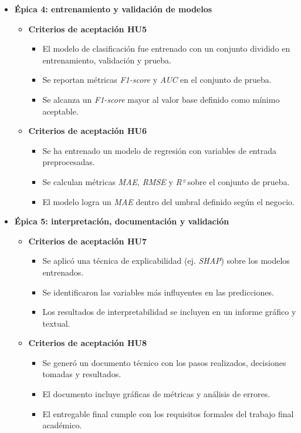 \documentclass[
11pt, %
]{charter}
\begin{document}
\begin{itemize}
  \item \textbf{Épica 4: entrenamiento y validación de modelos}
    \begin{itemize}
      \item \textbf{Criterios de aceptación HU5}
      \begin{itemize}
        \item El modelo de clasificación fue entrenado con un conjunto dividido en entrenamiento, validación y prueba.
        \item Se reportan métricas \textit{F1-score} y \textit{AUC} en el conjunto de prueba.
        \item Se alcanza un \textit{F1-score} mayor al valor base definido como mínimo aceptable.
      \end{itemize}
      \item \textbf{Criterios de aceptación HU6}
      \begin{itemize}
        \item Se ha entrenado un modelo de regresión con variables de entrada preprocesadas.
        \item Se calculan métricas \textit{MAE}, \textit{RMSE} y \textit{R²} sobre el conjunto de prueba.
        \item El modelo logra un \textit{MAE} dentro del umbral definido según el negocio.
      \end{itemize}
    \end{itemize}

  \item \textbf{Épica 5: interpretación, documentación y validación}
    \begin{itemize}
      \item \textbf{Criterios de aceptación HU7}
      \begin{itemize}
        \item Se aplicó una técnica de explicabilidad (ej. \textit{SHAP}) sobre los modelos entrenados.
        \item Se identificaron las variables más influyentes en las predicciones.
        \item Los resultados de interpretabilidad se incluyen en un informe gráfico y textual.
      \end{itemize}
      \item \textbf{Criterios de aceptación HU8}
      \begin{itemize}
        \item Se generó un documento técnico con los pasos realizados, decisiones tomadas y resultados.
        \item El documento incluye gráficas de métricas y análisis de errores.
        \item El entregable final cumple con los requisitos formales del trabajo final académico.
      \end{itemize}
    \end{itemize}
\end{itemize}
\end{document}
